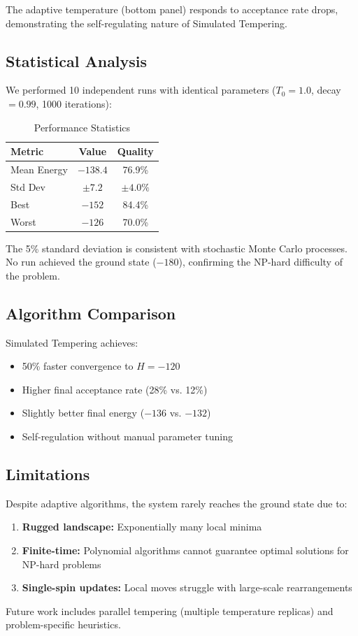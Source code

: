 The adaptive temperature (bottom panel) responds to acceptance rate drops, demonstrating the self-regulating nature of Simulated Tempering.

\subsection{Statistical Analysis}

We performed 10 independent runs with identical parameters ($T_0 = 1.0$, decay $= 0.99$, 1000 iterations):

\begin{table}[t]
\centering
\caption{Performance Statistics}
\small
\begin{tabular}{lcc}
\hline
\textbf{Metric} & \textbf{Value} & \textbf{Quality} \\
\hline
Mean Energy & $-138.4$ & 76.9\% \\
Std Dev & $\pm 7.2$ & $\pm 4.0\%$ \\
Best & $-152$ & 84.4\% \\
Worst & $-126$ & 70.0\% \\
\hline
\end{tabular}
\end{table}

The 5\% standard deviation is consistent with stochastic Monte Carlo processes. No run achieved the ground state ($-180$), confirming the NP-hard difficulty of the problem.

\subsection{Algorithm Comparison}

Simulated Tempering achieves:
\begin{itemize}
\item 50\% faster convergence to $H = -120$
\item Higher final acceptance rate (28\% vs. 12\%)
\item Slightly better final energy ($-136$ vs. $-132$)
\item Self-regulation without manual parameter tuning
\end{itemize}

\subsection{Limitations}

Despite adaptive algorithms, the system rarely reaches the ground state due to:
\begin{enumerate}
\item \textbf{Rugged landscape:} Exponentially many local minima
\item \textbf{Finite-time:} Polynomial algorithms cannot guarantee optimal solutions for NP-hard problems
\item \textbf{Single-spin updates:} Local moves struggle with large-scale rearrangements
\end{enumerate}

Future work includes parallel tempering (multiple temperature replicas) and problem-specific heuristics.
